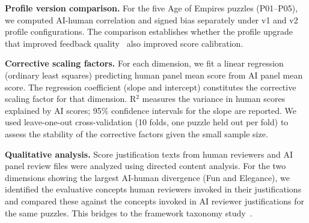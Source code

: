 \textbf{Profile version comparison.} For the five Age of Empires puzzles (P01--P05), we computed AI-human correlation and signed bias separately under v1 and v2 profile configurations. The comparison establishes whether the profile upgrade that improved feedback quality~\cite{dellaLibera2025taxonomy} also improved score calibration.

\textbf{Corrective scaling factors.} For each dimension, we fit a linear regression (ordinary least squares) predicting human panel mean score from AI panel mean score. The regression coefficient (slope and intercept) constitutes the corrective scaling factor for that dimension. R$^2$ measures the variance in human scores explained by AI scores; 95\% confidence intervals for the slope are reported. We used leave-one-out cross-validation (10 folds, one puzzle held out per fold) to assess the stability of the corrective factors given the small sample size.

\textbf{Qualitative analysis.} Score justification texts from human reviewers and AI panel review files were analyzed using directed content analysis. For the two dimensions showing the largest AI-human divergence (Fun and Elegance), we identified the evaluative concepts human reviewers invoked in their justifications and compared these against the concepts invoked in AI reviewer justifications for the same puzzles. This bridges to the framework taxonomy study~\cite{dellaLibera2025taxonomy}.
